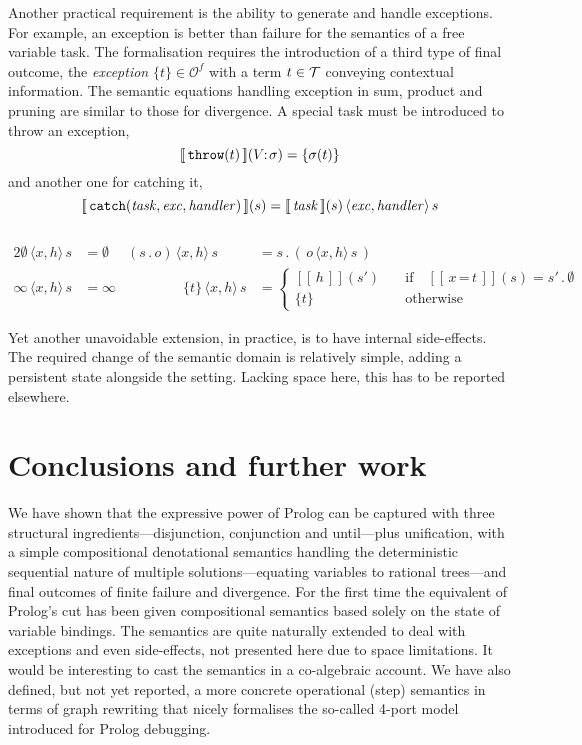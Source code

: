 \documentclass{tlp}
\newcommand\caseif[1]{\left\{\begin{array}{ll}#1\end{array}\right.}
\newcommand\cond{&\quad\!\!\mbox{if}\quad}
\newcommand\other{&\quad\!\!\mbox{otherwise}}
\def\denotstart{[\![\,}
\def\denotend{\,]\!]}
\def\denot#1{\denotstart#1\denotend}
\def\OO{\mathcal O}
\def\Out{\OO}
\def\s{\sigma}
\def\obeq{\,\texttt{=}\,}
\def\munt{\textsf{until}}
\def\mtt#1{\mbox{\tt #1}}
\def\stng#1#2{#1\!\!:\!#2}
\def\ff{\emptyset}
\def\soutsym{{\,.\,}}
\def\sout#1#2{#1\soutsym#2}
\def\catch#1#2{#1\,\langle #2\rangle\,s}
\def\ctch#1{\catch{#1}{x,h}}
\begin{document}
Another practical requirement is the ability to generate and handle
exceptions. For example, an exception is better than failure for the
semantics of a free variable task.  The formalisation requires the introduction
of a third type of final outcome, the \emph{exception} $\{t\}\in\Out^f$ with a term
$t\in{\cal T}$ conveying contextual information.  The semantic equations handling
exception in sum, product and pruning are similar to those for divergence. A
special task must be
introduced to throw an exception,\\[-13pt]
\[\denot{\mtt{throw}(t)}(\stng V\s)=\{\s(t)\}\]
and another one for catching it,\\[-13pt]
\[
\denot{\mtt{catch}(\mathit{task},\mathit{exc},\mathit{handler})}(s)=
\catch{\denot{\mathit{task}}(s)}{\mathit{exc},\mathit{handler}}
\]\\[-30pt]
\begin{alignat*}{2}
\ctch\ff &= \ff & \ctch{(\sout so)} &= \sout s{(\,\ctch o\,)}\\
\ctch\infty & = \infty & \qquad\qquad
\ctch{\{t\}} & = \caseif{
\denot h(s')\cond\denot{x\obeq t}(s)=\sout{s'\!}\ff\\
\{t\}\other
}
\end{alignat*}

Yet another unavoidable extension, in practice, is to have internal
side-effects. The required change of the semantic domain is relatively
simple, adding a persistent state alongside the setting. Lacking space here, this has to be
reported elsewhere.

\section{Conclusions and further work}

We have shown that the expressive power of Prolog can be captured with three
structural ingredients---disjunction, conjunction and \munt---plus unification,
with a simple compositional denotational semantics handling the deterministic
sequential nature of multiple solutions---equating variables to rational
trees---and final outcomes of finite failure and divergence. For the first time
the equivalent of Prolog's cut has been given compositional semantics based
solely on the state of variable bindings.  The semantics are quite naturally
extended to deal with exceptions and even side-effects, not presented here due to
space limitations.  It would be interesting to cast the semantics in a
co-algebraic account. We have also defined, but not yet reported, a more concrete
operational (step) semantics in terms of graph rewriting that nicely formalises
the so-called 4-port model introduced for Prolog debugging.
\end{document}
